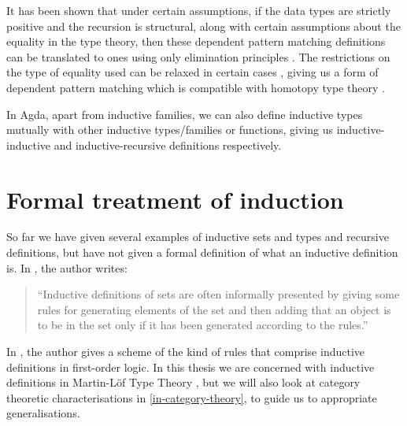 It has been shown that under certain assumptions, \ie if the data
types are strictly positive and the recursion is structural, along
with certain assumptions about the equality in the type theory, then
these dependent pattern matching definitions can be translated to ones
using only elimination principles \cite{Goguen2006}. The restrictions
on the type of equality used can be relaxed in certain cases
\cite{Cockx2014}, giving us a form of dependent pattern matching which
is compatible with homotopy type theory \cite{UFP2013}.

In Agda, apart from inductive families, we can also define inductive
types mutually with other inductive types/families or functions,
giving us inductive-inductive \cite{NordvallForsberg2013} and
inductive-recursive definitions \cite{Dybjer1999} respectively.

\section{Formal treatment of induction}

So far we have given several examples of inductive sets and types and
recursive definitions, but have not given a formal definition of what
an inductive definition is. In \cite{Aczel1977}, the author writes:

\begin{quote}
  ``Inductive definitions of sets are often informally presented by
  giving some rules for generating elements of the set and then adding
  that an object is to be in the set only if it has been generated
  according to the rules.''
\end{quote}

In \cite{MartinLof1971}, the author gives a scheme of the kind of
rules that comprise inductive definitions in first-order logic. In
this thesis we are concerned with inductive definitions in
Martin-L\"of Type Theory \cite{MartinLof1972}, but we will also look
at category theoretic characterisations in \cref{in-category-theory},
to guide us to appropriate generalisations.

